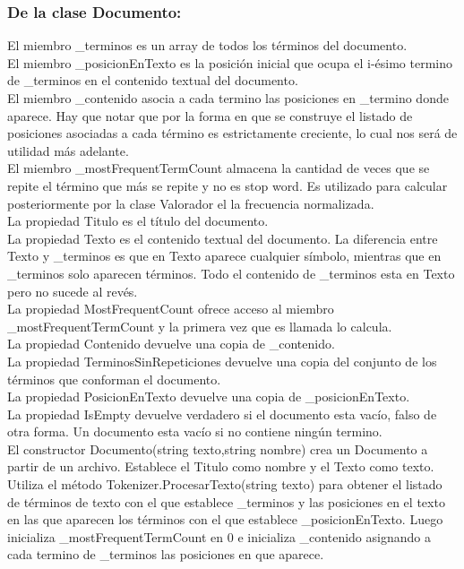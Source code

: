 \documentclass{article}
\begin{document}
\subsubsection{De la clase Documento:}
El miembro \_terminos es un array de todos los términos del documento.\\
El miembro \_posicionEnTexto es la posición inicial que ocupa el i-ésimo termino de \_terminos en el  contenido textual del documento.\\
El miembro \_contenido asocia a cada termino las posiciones en \_termino donde aparece. Hay que notar que por la forma en que se construye el listado de posiciones asociadas a cada término es estrictamente creciente, lo cual nos será de utilidad más adelante.\\
El miembro \_mostFrequentTermCount almacena la cantidad de veces que se repite el término que más se repite y no es stop word. Es utilizado para calcular posteriormente por la clase Valorador el la frecuencia normalizada.\\
La propiedad Titulo es el título del documento.\\
La propiedad Texto es el contenido textual del documento. La diferencia entre Texto y \_terminos es que en Texto aparece cualquier símbolo, mientras que en \_terminos solo aparecen términos. Todo el contenido de \_terminos esta en Texto pero no sucede al revés.\\
La propiedad MostFrequentCount ofrece acceso al miembro \_mostFrequentTermCount y la primera vez que es llamada lo calcula.\\
La propiedad Contenido devuelve una copia de \_contenido.\\
La propiedad TerminosSinRepeticiones devuelve una copia del conjunto de los términos que conforman el documento.\\
La propiedad PosicionEnTexto devuelve una copia de \_posicionEnTexto.\\
La propiedad IsEmpty devuelve verdadero si el documento esta vacío, falso de otra forma. Un documento esta vacío si no contiene ningún termino.\\
El constructor Documento(string texto,string nombre) crea un Documento a partir de un archivo. Establece el Titulo como nombre y el Texto como texto. Utiliza el método Tokenizer.ProcesarTexto(string texto) para obtener el listado de términos de texto con el que establece \_terminos y las posiciones en el texto en las que aparecen los términos con el que establece \_posicionEnTexto. Luego inicializa \_mostFrequentTermCount en 0 e inicializa \_contenido asignando a cada termino de \_terminos las posiciones en que aparece.\\
\end{document}

